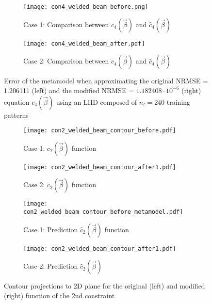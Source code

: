 \begin{figure}[h!]
\centering
\begin{subfigure}[b]{0.49\textwidth}
    \centering
    \caption{Case 1: Comparison between $c_{4}(\vec{β})$ and 
    $\widehat{c}_{4}(\vec{β})$} 
    \texttt{[image: con4\_welded\_beam\_before.png]}    
    \end{subfigure}
    \hfill
    \begin{subfigure}[b]{0.49\textwidth}
    \centering 
    \caption{Case 2: Comparison between $c_{4}(\vec{β})$ and 
    $\widehat{c}_{4}(\vec{β})$}
    \texttt{[image: con4\_welded\_beam\_after.pdf]} 
    \end{subfigure}
\caption{Error of the metamodel when approximating the original 
NRMSE = 1.206111 (left) and the modified NRMSE = $1.182408 \!
\cdot \! 10^{-6}$ (right) equation $c_{4}(\vec{β})$ using an 
LHD composed of $n_{t} = 240$ training patterns}
\label{fig:mod_c4} 
\end{figure}

\newpage


\begin{figure}[h!]
\centering
	\begin{subfigure}[b]{0.49\textwidth}
    \centering
    \caption{Case 1: $c_{2}(\vec{β})$ function}
    \texttt{[image: con2\_welded\_beam\_contour\_before.pdf]}    
    \end{subfigure}
    \hfill
    \begin{subfigure}[b]{0.49\textwidth}
    \centering 
    \caption{Case 2: $c_{2}(\vec{β})$ function}
    \texttt{[image: con2\_welded\_beam\_contour\_after1.pdf]} 
    \end{subfigure}
    \hfill
    \begin{subfigure}[b]{0.49\textwidth}
    \centering
    \caption{Case 1: Prediction $\widehat{c}_{2}(\vec{β})$ 
    function}
    \texttt{[image: con2\_welded\_beam\_contour\_before\_metamodel.pdf]}    
    \end{subfigure}
    \hfill
    \begin{subfigure}[b]{0.49\textwidth}
    \centering 
    \caption{Case 2: Prediction $\widehat{c}_{2}(\vec{β})$}
    \texttt{[image: con2\_welded\_beam\_contour\_after1.pdf]} 
    \end{subfigure}
\caption{Contour projections to 2D plane for the original 
(left) and modified (right) function of the 2nd constraint}
\label{fig:mod_c2} 
\end{figure}


